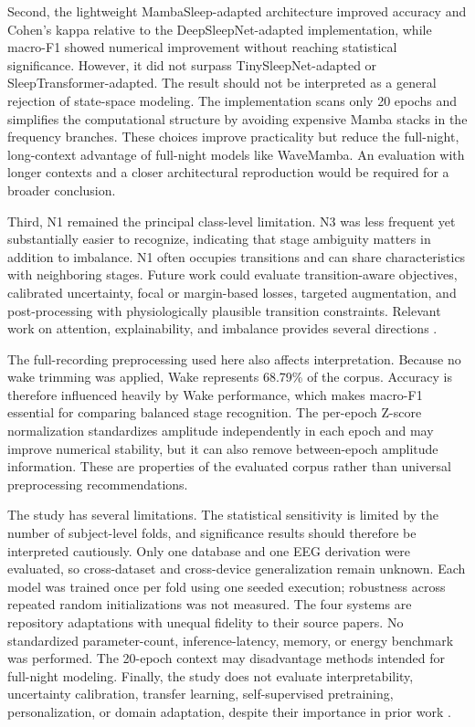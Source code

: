 \documentclass[conference]{IEEEtran}
\begin{document}
Second, the lightweight MambaSleep-adapted architecture improved accuracy and Cohen's kappa relative to the DeepSleepNet-adapted implementation, while macro-F1 showed numerical improvement without reaching statistical significance. However, it did not surpass TinySleepNet-adapted or SleepTransformer-adapted. The result should not be interpreted as a general rejection of state-space modeling. The implementation scans only 20 epochs and simplifies the computational structure by avoiding expensive Mamba stacks in the frequency branches. These choices improve practicality but reduce the full-night, long-context advantage of full-night models like WaveMamba. An evaluation with longer contexts and a closer architectural reproduction would be required for a broader conclusion.

Third, N1 remained the principal class-level limitation. N3 was less frequent yet substantially easier to recognize, indicating that stage ambiguity matters in addition to imbalance. N1 often occupies transitions and can share characteristics with neighboring stages. Future work could evaluate transition-aware objectives, calibrated uncertainty, focal or margin-based losses, targeted augmentation, and post-processing with physiologically plausible transition constraints. Relevant work on attention, explainability, and imbalance provides several directions \cite{eldele2021attention,dutt2023sleepxai,zhou2022imbalance}.

The full-recording preprocessing used here also affects interpretation. Because no wake trimming was applied, Wake represents 68.79\% of the corpus. Accuracy is therefore influenced heavily by Wake performance, which makes macro-F1 essential for comparing balanced stage recognition. The per-epoch Z-score normalization standardizes amplitude independently in each epoch and may improve numerical stability, but it can also remove between-epoch amplitude information. These are properties of the evaluated corpus rather than universal preprocessing recommendations.

The study has several limitations. The statistical sensitivity is limited by the number of subject-level folds, and significance results should therefore be interpreted cautiously. Only one database and one EEG derivation were evaluated, so cross-dataset and cross-device generalization remain unknown. Each model was trained once per fold using one seeded execution; robustness across repeated random initializations was not measured. The four systems are repository adaptations with unequal fidelity to their source papers. No standardized parameter-count, inference-latency, memory, or energy benchmark was performed. The 20-epoch context may disadvantage methods intended for full-night modeling. Finally, the study does not evaluate interpretability, uncertainty calibration, transfer learning, self-supervised pretraining, personalization, or domain adaptation, despite their importance in prior work \cite{phan2020personalized,phan2020transfer,fan2022domain,eldele2023selfsupervised}.
\end{document}
